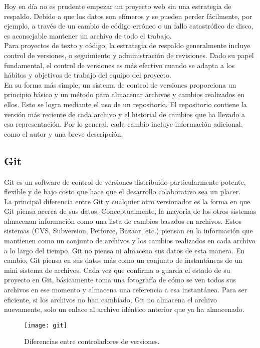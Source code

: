 Hoy en día no es prudente empezar un proyecto web sin una estrategia de respaldo. Debido a que los datos son efímeros y se pueden perder fácilmente, por ejemplo, a través de un cambio de código erróneo o un fallo catastrófico de disco, es aconsejable mantener un archivo de todo el trabajo.\\[0.8cm]
Para proyectos de texto y código, la estrategia de respaldo generalmente incluye control de versiones, o seguimiento y administración de revisiones.  Dado su papel fundamental, el control de versiones es más efectivo cuando se adapta a los hábitos y objetivos de trabajo del equipo del proyecto.\\[0.8cm]
En su forma más simple, un sistema de control de versiones proporciona un principio básico y un método para almacenar archivos y cambios realizados en ellos. Esto se logra mediante el uso de un repositorio. El repositorio contiene la versión más reciente de cada archivo y el historial de cambios que ha llevado a esa representación. Por lo general, cada cambio incluye información adicional, como el autor y una breve descripción.
\subsection{Git}
Git es un software de control de versiones distribuido particularmente potente, flexible y de bajo costo que hace que el desarrollo colaborativo sea un placer. \\[0.8cm]
La principal diferencia entre Git y cualquier otro versionador es la forma en que Git piensa acerca de sus datos. Conceptualmente, la mayoría de los otros sistemas almacenan información como una lista de cambios basados en archivos. Estos sistemas (CVS, Subversion, Perforce, Bazaar, etc.) piensan en la información que mantienen como un conjunto de archivos y los cambios realizados en cada archivo a lo largo del tiempo. Git no piensa ni almacena sus datos de esta manera. En cambio, Git piensa en sus datos más como un conjunto de instantáneas de un mini sistema de archivos. Cada vez que confirma o guarda el estado de su proyecto en Git, básicamente toma una fotografía de cómo se ven todos sus archivos en ese momento y almacena una referencia a esa instantánea. Para ser eficiente, si los archivos no han cambiado, Git no almacena el archivo nuevamente, solo un enlace al archivo idéntico anterior que ya ha almacenado. \\[0.8cm]
\begin{figure}[H]
  \centering
  \texttt{[image: git]}
  \caption{Diferencias entre controladores de versiones.}
\end{figure}